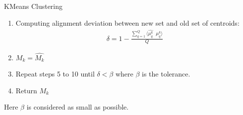 \documentclass{beamer}
\newcounter{saveenumi}
\newcommand{\conti}{\setcounter{enumi}{\value{saveenumi}}}
\begin{document}
    \begin{frame}{KMeans Clustering}
        \begin{enumerate}
            \conti
            \item Computing alignment deviation between new set and old set of centroids:
            \begin{align*}
                \delta = 1 - \frac{\sum_{q=1}^{Q}\langle \hat{\mu_{q}^{k}}\; \; \mu_{q}^{k} \rangle}{Q}
            \end{align*}
            \item $M_{k} = \hat{M_{k}}$
            \item Repeat steps 5 to 10 until $\delta < \beta $ where $\beta$ is the tolerance.
            \item Return $M_{k}$
        \end{enumerate}
        Here $\beta$ is considered as small as possible.
    \end{frame}
\end{document}
